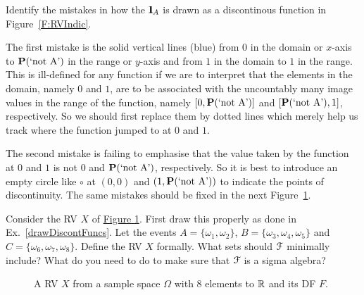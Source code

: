 \begin{Exercise}[title={Drawing discontinuous functions},label={drawDiscontFuncs}]
Identify the mistakes in how the  ${1}\mspace{-11 mu}{1}_A$ is drawn as a discontinous function in Figure~\ref{F:RVIndic}.
\end{Exercise}
\begin{Answer}
The first mistake is the solid vertical lines (blue) from $0$ in the domain or $x$-axis to $\mathbf{P}( \text{`not A'})$ in the range or $y$-axis and from $1$ in the domain to $1$ in the range. 
This is ill-defined for any function if we are to interpret that the elements in the domain, namely $0$ and $1$, are to be associated with the uncountably many image values in the range of the function, namely $[0,\mathbf{P}( \text{`not A'})]$ and $[\mathbf{P}( \text{`not A'}),1]$, respectively. 
So we should first replace them by dotted lines which merely help us track where the function jumped to at $0$ and $1$.

The second mistake is failing to emphasise that the value taken by the function at $0$ and $1$ is not $0$ and $\mathbf{P}( \text{`not A'})$, respectively. So it is best to introduce an empty circle like $\circ$ at $(0,0)$ and $(1,\mathbf{P}( \text{`not A'}))$ to indicate the points of discontinuity. The same mistakes should be fixed in the next Figure~\ref{F:RVABC}.
\end{Answer}

\begin{classwork}\label{CW:ARVwith3Values}
Consider the RV $X$ of \hyperref[F:RVABC]{Figure \ref*{F:RVABC}}.  First draw this properly as done in Ex.~\ref{drawDiscontFuncs}. Let the events $A = \{\omega_1, \omega_2\}$, $B = \{\omega_3, \omega_4, \omega_5\}$ and $C = \{\omega_6, \omega_7,\omega_8 \}$.  Define the RV $X$ formally.  What sets should $\mathcal{F}$ minimally include?  What do you need to do to make sure that $\mathcal{F}$ is a sigma algebra?
\end{classwork}
\begin{figure}[htpb]
\caption{A RV $X$ from a sample space $\Omega$ with $8$ elements to $\mathbb{R}$ and its DF $F$.\label{F:RVABC}}
\centering   {}
\end{figure}

